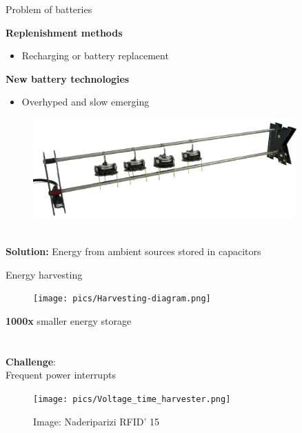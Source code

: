 \documentclass{beamer}
\begin{document}
\begin{frame}{Problem of batteries}
	\begin{minipage}{0.54\textwidth}
		\textbf{Replenishment methods}
		\begin{itemize}
			\item Recharging or battery replacement
		\end{itemize}	
		\vspace{1em}
			\textbf{New battery technologies}
		\begin{itemize}
			\item Overhyped and slow emerging
		\end{itemize}
		\end{minipage}
	\begin{minipage}{0.45\textwidth}\raggedleft
		\begin{figure}
			\centering
			\includegraphics[width=0.9\textwidth]{pics/Kilobot_charger_with_robots1-495x188.png}
		\end{figure}
	\end{minipage} \\
	\vspace{3em}
	\pause
	\textbf{Solution:} 
	Energy from ambient sources stored in capacitors
\end{frame}

\begin{frame}{Energy harvesting}
	\begin{figure}
		\centering
		\texttt{[image: pics/Harvesting-diagram.png]}
	\end{figure}
	\begin{minipage}{0.45\textwidth}
		\textbf{1000x} smaller energy storage \\\\\\
		\textbf{Challenge}: \\
		Frequent power interrupts
	\end{minipage}
	\begin{minipage}{0.54\textwidth}\raggedleft
		\begin{figure}
			\vspace{2em}
			\texttt{[image: pics/Voltage\_time\_harvester.png]}
			\caption*{Image: Naderiparizi RFID' 15}
		\end{figure}
	\end{minipage}
\end{frame}
\end{document}
